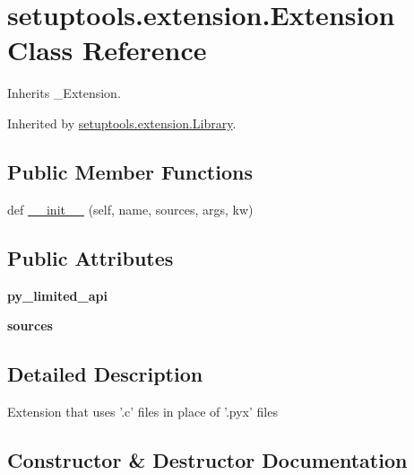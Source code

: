 \hypertarget{classsetuptools_1_1extension_1_1_extension}{}\section{setuptools.\+extension.\+Extension Class Reference}
\label{classsetuptools_1_1extension_1_1_extension}


Inherits \+\_\+\+Extension.



Inherited by \hyperlink{classsetuptools_1_1extension_1_1_library}{setuptools.\+extension.\+Library}.

\subsection*{Public Member Functions}
\begin{DoxyCompactItemize}
\item 
def \hyperlink{classsetuptools_1_1extension_1_1_extension_ab04051fffd82a5063ee962f9f89283e0}{\+\_\+\+\_\+init\+\_\+\+\_\+} (self, name, sources, args, kw)
\end{DoxyCompactItemize}
\subsection*{Public Attributes}
\begin{DoxyCompactItemize}
\item 
\mbox{\label{classsetuptools_1_1extension_1_1_extension_a738c98bc01dd531f3c7ff4bc9a893011}} 
{\bfseries py\+\_\+limited\+\_\+api}
\item 
\mbox{\label{classsetuptools_1_1extension_1_1_extension_a267f08175ebbf89924e8f8d6d707c5f8}} 
{\bfseries sources}
\end{DoxyCompactItemize}


\subsection{Detailed Description}
\begin{DoxyVerb}Extension that uses '.c' files in place of '.pyx' files\end{DoxyVerb}
 

\subsection{Constructor \& Destructor Documentation}
\mbox{\label{classsetuptools_1_1extension_1_1_extension_ab04051fffd82a5063ee962f9f89283e0}} 
